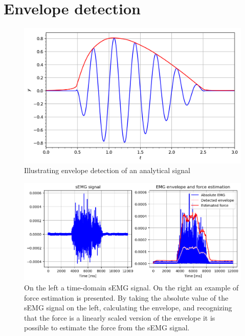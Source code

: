 \section{Envelope detection}

\begin{figure}[h!t]
	\begin{center}
		\includegraphics[width=0.7\columnwidth]{images/envelope_wikipedia.png}
	\end{center}
	\caption{Illustrating envelope detection of an analytical signal \cite{envelope_wikipedia}}
	\label{fig:envelope_wikipedia}
\end{figure}

\begin{figure}[h!t]
	\begin{center}
		\includegraphics[width=1.0\columnwidth]{images/amplitude_force_estimation_example.png}
	\end{center}
	\caption{On the left a time-domain sEMG signal. On the right an example of force estimation is presented. By taking the absolute value of the sEMG signal on the left, calculating the envelope, and recognizing that the force is a linearly scaled version of the envelope it is possible to estimate the force from the sEMG signal.}
	\label{fig:amplitude_estimation_example}
\end{figure}


